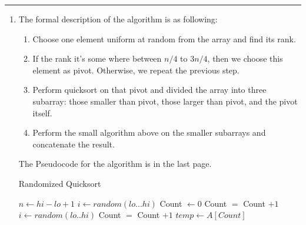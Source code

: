 \documentclass[11pt]{article}
\begin{document}




\begin{quote}

\end{quote}
\hrule


\begin{solution}
\item
\begin{enumerate}
    \item The formal description of the algorithm is as following:
    \begin{enumerate}
        \item Choose one element uniform at random from the array and find its rank.
        \item If the rank it's some where between $n/4$ to $3n/4$, then we choose this element as pivot. Otherwise, we repeat the previous step.
        \item Perform quicksort on that pivot and divided the array into three subarray: those smaller than pivot, those larger than pivot, and the pivot itself.
        \item Perform the small algorithm above on the smaller subarrays and concatenate the result.
    \end{enumerate}
    The Pseudocode for the algorithm is in the last page.
    \begin{algorithm}
        \caption{Randomized Quicksort}
        \begin{algorithmic} 
        \newline
        \STATE $n \leftarrow hi - lo + 1$
        \STATE $i \leftarrow random (lo ... hi)$
        \STATE Count $\leftarrow 0$
        \STATE Count $=$ Count $+ 1$
        \ENDIF
        \ENDFOR
        \STATE $i \leftarrow random (lo .. hi) $
        \STATE Count $=$ Count $+ 1$
        \ENDIF
        \ENDFOR
        \ENDWHILE
        \STATE $temp \leftarrow A[Count]$

\end{algorithmic}
\end{algorithm}
\end{enumerate}
\end{solution}
\end{document}
